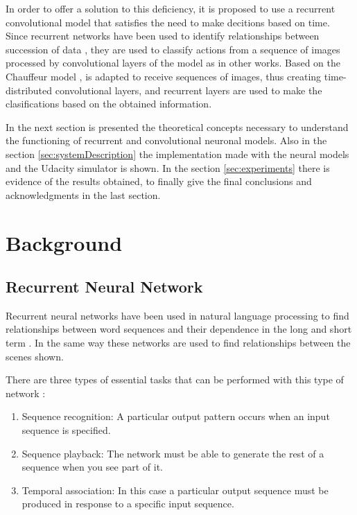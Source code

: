 \documentclass{cys}
\begin{document}
In order to offer a solution to this deficiency, it is proposed to use a recurrent convolutional model that satisfies the need to make decitions based on time. Since recurrent networks have been used to identify relationships between succession of data \cite{bianchi2017recurrent}, they are used to classify actions from a sequence of images processed by convolutional layers of the model as in other works. Based on the Chauffeur model \cite{tian2018deeptest}, is adapted to receive sequences of images, thus creating time-distributed convolutional layers, and recurrent layers are used to make the clasifications based on the obtained information.

In the next section is presented the theoretical concepts necessary to understand the functioning of recurrent and convolutional neuronal models. Also in the section \ref{sec:systemDescription} the implementation made with the neural models and the Udacity simulator is shown. In the section \ref{sec:experiments} there is evidence of the results obtained, to finally give the final conclusions and acknowledgments in the last section.

\section{Background}
\label{sec:Background}

\subsection{Recurrent Neural Network}
Recurrent neural networks have been used in natural language processing to find relationships between word sequences and their dependence in the long and short term \cite{bianchi2017recurrent}. In the same way these networks are used to find relationships between the scenes shown.

There are three types of essential tasks that can be performed with this type of network \cite{bonet2007redes}:

\begin{enumerate}
	\item Sequence recognition: A particular output pattern occurs when an input sequence is specified.
	
	\item Sequence playback: The network must be able to generate the rest of a sequence when you see part of it.
	
	\item Temporal association: In this case a particular output sequence must be produced in response to a specific input sequence.\\
\end{enumerate}
\end{document}
